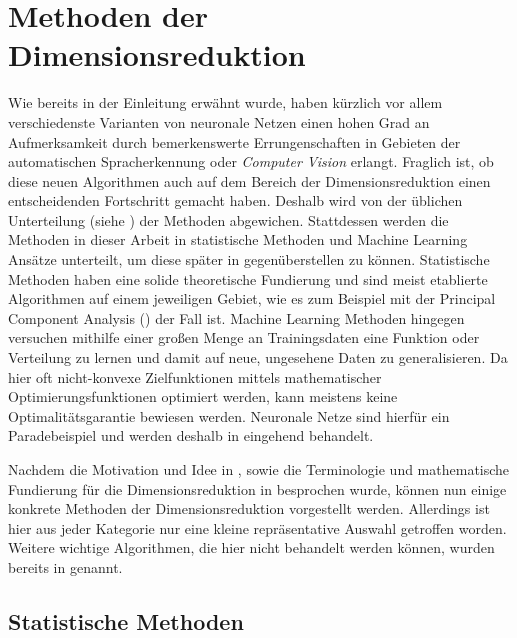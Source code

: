 \chapter{Methoden der Dimensionsreduktion}
\label{ch:MethodenDerDimRed}

Wie bereits in der Einleitung erwähnt wurde, haben kürzlich vor allem verschiedenste Varianten von
neuronale Netzen einen hohen Grad an Aufmerksamkeit durch bemerkenswerte Errungenschaften in
Gebieten der automatischen Spracherkennung oder \textit{Computer Vision} erlangt. Fraglich ist, ob
diese neuen Algorithmen auch auf dem Bereich der Dimensionsreduktion einen entscheidenden
Fortschritt gemacht haben. Deshalb wird von der üblichen Unterteilung (siehe
) der Methoden abgewichen. Stattdessen werden die Methoden
in dieser Arbeit in statistische Methoden und Machine Learning Ansätze unterteilt, um diese später
in  gegenüberstellen zu können. Statistische Methoden haben eine solide
theoretische Fundierung und sind meist etablierte Algorithmen auf einem jeweiligen Gebiet, wie es
zum Beispiel mit der Principal Component Analysis
() der Fall ist. Machine Learning Methoden hingegen
versuchen mithilfe einer großen Menge an Trainingsdaten eine Funktion oder Verteilung zu lernen und
damit auf neue, ungesehene Daten zu generalisieren. Da hier oft nicht-konvexe Zielfunktionen
mittels mathematischer Optimierungsfunktionen optimiert werden, kann meistens keine
Optimalitätsgarantie bewiesen werden. Neuronale Netze sind hierfür ein Paradebeispiel und werden
deshalb in  eingehend behandelt.

Nachdem die Motivation und Idee in , sowie die Terminologie und mathematische
Fundierung für die Dimensionsreduktion in  besprochen wurde, können
nun einige konkrete Methoden der Dimensionsreduktion vorgestellt werden. Allerdings ist hier aus
jeder Kategorie nur eine kleine repräsentative Auswahl getroffen worden. Weitere wichtige
Algorithmen, die hier nicht behandelt werden können, wurden bereits in
 genannt.

\section{Statistische Methoden}
\label{ch:MethodenDerDimRed:statistisch}

